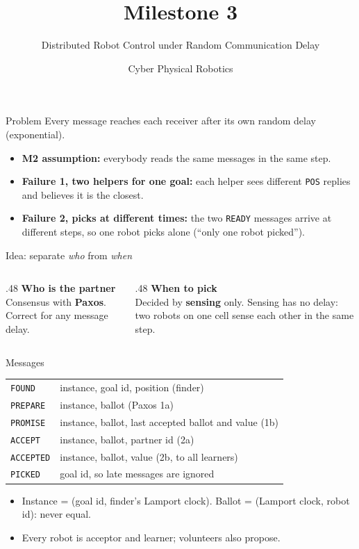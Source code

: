 \documentclass[aspectratio=169,10pt]{beamer}
\title{Milestone 3}
\subtitle{Distributed Robot Control under Random Communication Delay}
\author{Cyber Physical Robotics}
\date{}
\begin{document}
\maketitle

\begin{frame}{Problem}
Every message reaches each receiver after its own random delay (exponential).
\medskip
\begin{itemize}
\item \textbf{M2 assumption:} everybody reads the same messages in the same step.
\item \textbf{Failure 1, two helpers for one goal:} each helper sees different \texttt{POS} replies and believes it is the closest.
\item \textbf{Failure 2, picks at different times:} the two \texttt{READY} messages arrive at different steps, so one robot picks alone (``only one robot picked'').
\end{itemize}
\end{frame}

\begin{frame}{Idea: separate \emph{who} from \emph{when}}
\begin{columns}[T]
\begin{column}{.48\textwidth}
\textbf{Who is the partner}\\[2pt]
Consensus with \textbf{Paxos}. Correct for any message delay.
\end{column}
\begin{column}{.48\textwidth}
\textbf{When to pick}\\[2pt]
Decided by \textbf{sensing} only. Sensing has no delay: two robots on one cell sense each other in the same step.
\end{column}
\end{columns}
\end{frame}

\begin{frame}{Messages}
\small
\begin{tabular}{@{}ll@{}}
\toprule
\texttt{FOUND} & instance, goal id, position (finder)\\
\texttt{PREPARE} & instance, ballot (Paxos 1a)\\
\texttt{PROMISE} & instance, ballot, last accepted ballot and value (1b)\\
\texttt{ACCEPT} & instance, ballot, partner id (2a)\\
\texttt{ACCEPTED} & instance, ballot, value (2b, to all learners)\\
\texttt{PICKED} & goal id, so late messages are ignored\\
\bottomrule
\end{tabular}
\medskip
\begin{itemize}
\item Instance = (goal id, finder's Lamport clock). Ballot = (Lamport clock, robot id): never equal.
\item Every robot is acceptor and learner; volunteers also propose.
\end{itemize}
\end{frame}
\end{document}
